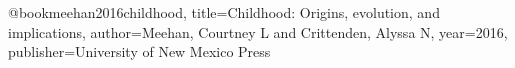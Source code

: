 @book{meehan2016childhood,
  title={Childhood: Origins, evolution, and implications},
  author={Meehan, Courtney L and Crittenden, Alyssa N},
  year={2016},
  publisher={University of New Mexico Press}
}